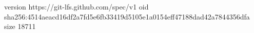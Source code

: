 version https://git-lfs.github.com/spec/v1
oid sha256:4514aeacd16df2a7fd5e6fb33419d5105e1a0154eff47188dad42a7844356dfa
size 18711

